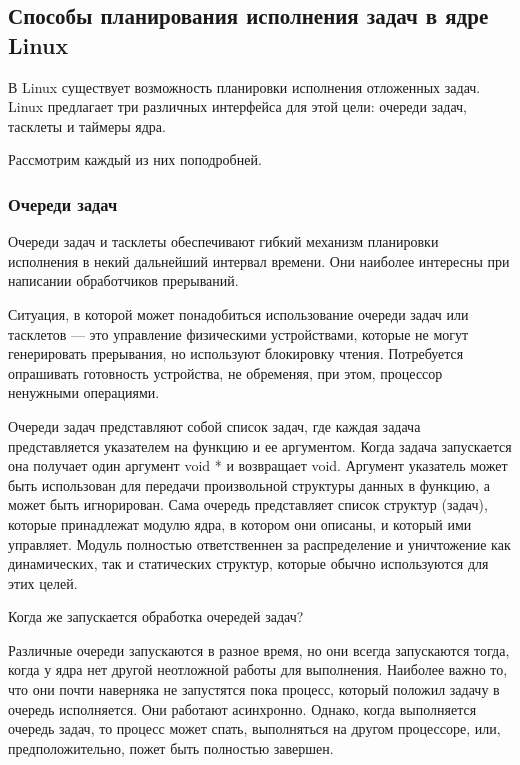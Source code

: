 \documentclass[a4paper,14pt]{extarticle}
\begin{document}
 	\subsection{Способы планирования исполнения задач в ядре Linux}
 	
 	В Linux существует возможность планировки исполнения отложенных задач. Linux предлагает три различных интерфейса для этой цели: очереди задач, тасклеты и таймеры ядра.
 	
 	Рассмотрим каждый из них поподробней.
 	
 	\subsubsection{Очереди задач}
 	
 	Очереди задач и тасклеты обеспечивают гибкий механизм планировки исполнения в некий дальнейший интервал времени. Они наиболее интересны при написании
 	обработчиков прерываний. 
 	
 	Ситуация, в которой может понадобиться использование очереди задач или тасклетов — это управление физическими устройствами, которые не могут генерировать прерывания, но используют блокировку чтения. Потребуется
 	опрашивать готовность устройства, не обременяя, при этом, процессор ненужными операциями.
 	
 	Очереди задач представляют собой список задач, где каждая задача представляется указателем на функцию и ее аргументом.
 	Когда задача запускается она получает один аргумент void * и возвращает void. Аргумент указатель может быть использован для передачи произвольной структуры данных в функцию, а может быть игнорирован. Сама очередь представляет список структур (задач), которые принадлежат модулю ядра, в котором они описаны, и который ими управляет. Модуль полностью
 	ответственнен за распределение и уничтожение как динамических, так и статических структур, которые обычно используются для этих целей.
 	
 	Когда же запускается обработка очередей задач? 
 	
 	Различные очереди запускаются в разное время, но они всегда запускаются тогда, когда у ядра нет другой неотложной работы для выполнения. Наиболее важно то, что они почти наверняка не запустятся пока процесс, который положил задачу в очередь исполняется. Они работают асинхронно. Однако, когда выполняется очередь задач, то процесс может спать, выполняться на другом процессоре, или, предположительно, пожет быть полностью завершен.
 	
 	\newpage
 	
\end{document}
